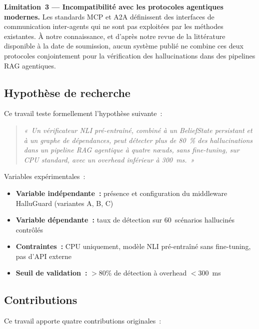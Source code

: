 \documentclass[12pt,a4paper]{article}
\begin{document}
\textbf{Limitation~3 --- Incompatibilité avec les protocoles agentiques modernes.} Les standards MCP \cite{anthropic2024mcp} et A2A \cite{google2024a2a} définissent des interfaces de communication inter-agents qui ne sont pas exploitées par les méthodes existantes. À notre connaissance, et d'après notre revue de la littérature disponible à la date de soumission, aucun système publié ne combine ces deux protocoles conjointement pour la vérification des hallucinations dans des pipelines RAG agentiques.

\subsection{Hypothèse de recherche}

Ce travail teste formellement l'hypothèse suivante~:

\begin{quote}
\textit{«~Un vérificateur NLI pré-entraîné, combiné à un BeliefState persistant et à un graphe de dépendances, peut détecter plus de 80~\% des hallucinations dans un pipeline RAG agentique à quatre nœuds, sans fine-tuning, sur CPU standard, avec un overhead inférieur à 300~ms.~»}
\end{quote}

\noindent Variables expérimentales~:
\begin{itemize}[noitemsep]
  \item \textbf{Variable indépendante~:} présence et configuration du middleware HalluGuard (variantes A, B, C)
  \item \textbf{Variable dépendante~:} taux de détection sur 60~scénarios hallucinés contrôlés
  \item \textbf{Contraintes~:} CPU uniquement, modèle NLI pré-entraîné sans fine-tuning, pas d'API externe
  \item \textbf{Seuil de validation~:} $>80\%$ de détection à overhead $<300$~ms
\end{itemize}

\subsection{Contributions}

Ce travail apporte quatre contributions originales~:
\end{document}
